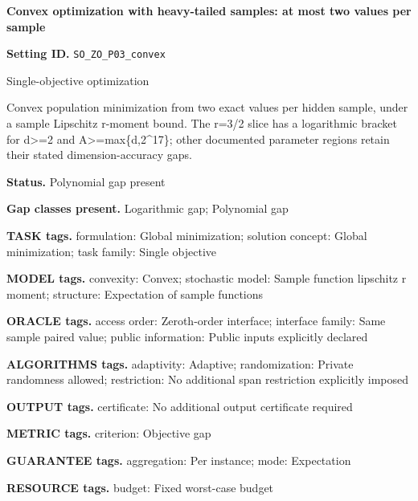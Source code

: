 \documentclass[10pt,a4paper]{article}
\begin{document}
\raggedright

{\LARGE\bfseries\sffamily\color{AtlasNavy} Convex optimization with heavy-tailed samples: at most two values per sample\par}\vspace{5pt}


\textbf{Setting ID.} \texttt{SO\_\allowbreak{}ZO\_\allowbreak{}P03\_\allowbreak{}convex}



Single-objective optimization



Convex population minimization from two exact values per hidden sample, under a sample Lipschitz r-moment bound. The r=3/2 slice has a logarithmic bracket for d>=2 and A>=max\{d,2\textasciicircum{}17\}; other documented parameter regions retain their stated dimension-accuracy gaps.



\textbf{Status.} Polynomial gap present



\textbf{Gap classes present.} Logarithmic gap; Polynomial gap



\textbf{TASK tags.} formulation: Global minimization; solution concept: Global minimization; task family: Single objective



\textbf{MODEL tags.} convexity: Convex; stochastic model: Sample function lipschitz r moment; structure: Expectation of sample functions



\textbf{ORACLE tags.} access order: Zeroth-order interface; interface family: Same sample paired value; public information: Public inputs explicitly declared



\textbf{ALGORITHMS tags.} adaptivity: Adaptive; randomization: Private randomness allowed; restriction: No additional span restriction explicitly imposed



\textbf{OUTPUT tags.} certificate: No additional output certificate required



\textbf{METRIC tags.} criterion: Objective gap



\textbf{GUARANTEE tags.} aggregation: Per instance; mode: Expectation



\textbf{RESOURCE tags.} budget: Fixed worst-case budget
\end{document}
